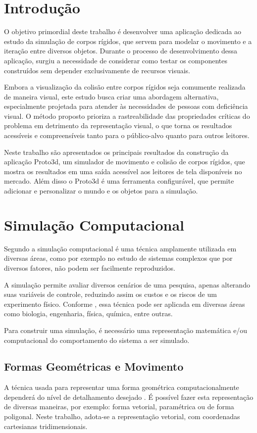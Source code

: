 \documentclass[12pt]{article}
\begin{document}
\section{Introdução}

O objetivo primordial deste trabalho é desenvolver uma aplicação dedicada ao estudo da simulação de corpos rígidos, que servem para modelar o movimento e a iteração entre diversos objetos. Durante o processo de desenvolvimento dessa aplicação, surgiu a necessidade de considerar como testar os componentes construídos sem depender exclusivamente de recursos visuais.

Embora a visualização da colisão entre corpos rígidos seja  comumente realizada de maneira visual, este estudo busca criar uma abordagem alternativa, especialmente projetada para atender às necessidades de pessoas com deficiência visual. O método proposto prioriza a rastreabilidade das propriedades críticas do problema em detrimento da representação visual, o que torna os resultados acessíveis e compreensíveis tanto para o público-alvo quanto para outros leitores.

Neste trabalho são apresentados os principais resultados da construção da aplicação Proto3d, um simulador de movimento e colisão de corpos rígidos, que mostra os resultados em uma saída acessível aos leitores de tela disponíveis no mercado. Além disso o Proto3d é uma ferramenta configurável, que permite adicionar e personalizar o mundo e os objetos para a simulação.

\section{Simulação Computacional}

Segundo \cite{duran2018computer} a simulação computacional é uma técnica amplamente utilizada em diversas áreas, como por exemplo no estudo de sistemas complexos que por diversos fatores, não podem ser facilmente reproduzidos.

A simulação permite avaliar diversos cenários de uma pesquisa, apenas alterando suas variáveis de controle, reduzindo assim os custos e os riscos de um experimento físico. Conforme \cite{marschner2018}, essa técnica pode ser aplicada em diversas áreas como biologia, engenharia, física, química, entre outras.

Para construir uma simulação, é necessário uma representação matemática e/ou computacional do comportamento do sistema a ser simulado.

\subsection{Formas Geométricas e Movimento}
A técnica usada para representar uma forma geométrica computacionalmente dependerá do nível de detalhamento desejado \cite{pharr2016}. É possível fazer esta representação de diversas maneiras, por exemplo: forma vetorial, paramétrica ou de forma poligonal. Neste trabalho, adota-se a representação vetorial, com coordenadas cartesianas tridimensionais.
\end{document}

